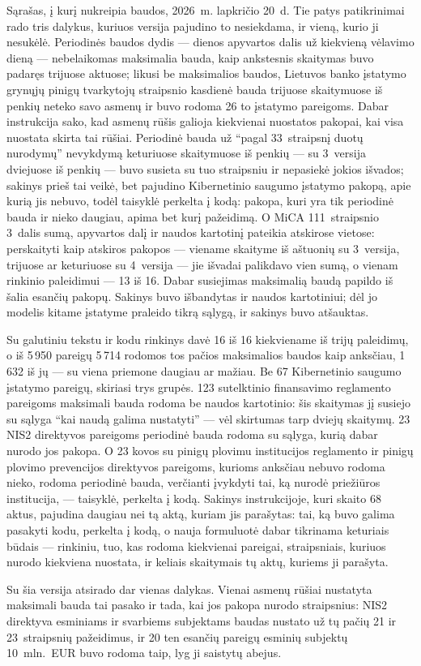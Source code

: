 \begin{lessonbox}{Sąrašas, į kurį nukreipia baudos, 2026~m. lapkričio 20~d.}
Tie patys patikrinimai rado tris dalykus, kuriuos versija pajudino to nesiekdama, ir vieną,
kurio ji nesukėlė. Periodinės baudos dydis --- dienos apyvartos dalis už kiekvieną vėlavimo
dieną --- nebelaikomas maksimalia bauda, kaip ankstesnis skaitymas buvo padaręs trijuose
aktuose; likusi be maksimalios baudos, Lietuvos banko įstatymo grynųjų pinigų tvarkytojų
straipsnio kasdienė bauda trijuose skaitymuose iš penkių neteko savo asmenų ir buvo rodoma 26
to įstatymo pareigoms. Dabar instrukcija sako, kad asmenų rūšis galioja kiekvienai nuostatos
pakopai, kai visa nuostata skirta tai rūšiai. Periodinė bauda už \enquote{pagal 33~straipsnį
duotų nurodymų} nevykdymą keturiuose skaitymuose iš penkių --- su 3~versija dviejuose iš
penkių --- buvo susieta su tuo straipsniu ir nepasiekė jokios išvados; sakinys prieš tai
veikė, bet pajudino Kibernetinio saugumo įstatymo pakopą, apie kurią jis nebuvo, todėl
taisyklė perkelta į kodą: pakopa, kuri yra tik periodinė bauda ir nieko daugiau, apima bet
kurį pažeidimą. O MiCA 111~straipsnio 3~dalis sumą, apyvartos dalį ir naudos kartotinį
pateikia atskirose vietose: perskaityti kaip atskiros pakopos --- viename skaityme iš aštuonių
su 3~versija, trijuose ar keturiuose su 4~versija --- jie išvadai palikdavo vien sumą, o
vienam rinkinio paleidimui --- 13 iš 16. Dabar susiejimas maksimalią baudą papildo iš šalia
esančių pakopų. Sakinys buvo išbandytas ir naudos kartotiniui; dėl jo modelis kitame įstatyme
praleido tikrą sąlygą, ir sakinys buvo atšauktas.

Su galutiniu tekstu ir kodu rinkinys davė 16 iš 16 kiekviename iš trijų paleidimų, o iš
5\,950 pareigų 5\,714 rodomos tos pačios maksimalios baudos kaip anksčiau, 1\,632 iš jų --- su viena
priemone daugiau ar mažiau. Be 67 Kibernetinio saugumo įstatymo pareigų, skiriasi trys grupės. 123 sutelktinio finansavimo reglamento pareigoms maksimali bauda rodoma be naudos kartotinio: šis skaitymas jį susiejo su sąlyga \enquote{kai naudą galima nustatyti} --- vėl skirtumas tarp dviejų skaitymų. 23 NIS2 direktyvos pareigoms periodinė bauda rodoma su sąlyga, kurią dabar nurodo jos pakopa. O 23 kovos su pinigų plovimu institucijos reglamento ir pinigų plovimo prevencijos direktyvos pareigoms, kurioms anksčiau nebuvo rodoma nieko, rodoma periodinė bauda, verčianti įvykdyti tai, ką nurodė priežiūros institucija, --- taisyklė, perkelta į kodą. Sakinys instrukcijoje, kuri skaito 68 aktus,
pajudina daugiau nei tą aktą, kuriam jis parašytas: tai, ką buvo galima pasakyti kodu,
perkelta į kodą, o nauja formuluotė dabar tikrinama keturiais būdais --- rinkiniu, tuo, kas
rodoma kiekvienai pareigai, straipsniais, kuriuos nurodo kiekviena nuostata, ir keliais
skaitymais tų aktų, kuriems ji parašyta.

Su šia versija atsirado dar vienas dalykas. Vienai asmenų rūšiai nustatyta maksimali bauda tai
pasako ir tada, kai jos pakopa nurodo straipsnius: NIS2 direktyva esminiams ir svarbiems
subjektams baudas nustato už tų pačių 21 ir 23~straipsnių pažeidimus, ir 20 ten esančių
pareigų esminių subjektų 10~mln.~EUR buvo rodoma taip, lyg ji saistytų abejus.
\end{lessonbox}

